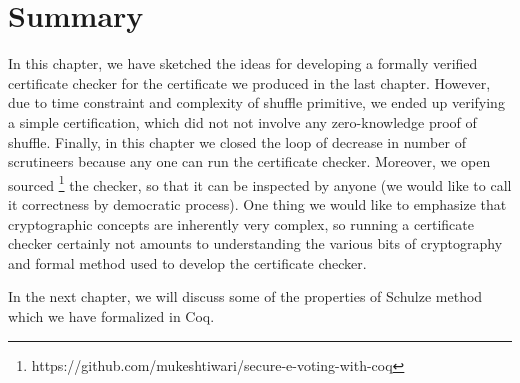 \section{Summary}
\label{sec:summary_software}
In this chapter, we have sketched the ideas for developing a formally verified certificate checker
for the certificate we produced in the last chapter. However, due to time constraint and 
complexity of shuffle primitive, 
we ended up verifying a simple certification, which did not not involve any zero-knowledge proof 
of shuffle.  Finally, in this chapter we closed the loop of decrease in number of scrutineers because 
any one can run the certificate checker. Moreover, we open sourced 
\footnote{https://github.com/mukeshtiwari/secure-e-voting-with-coq} the checker, so 
that it can be inspected by anyone (we would like to call it correctness by democratic 
process).  One thing we would like to emphasize that cryptographic concepts are 
inherently very complex, so running a certificate checker certainly not amounts 
to understanding the various bits of cryptography and formal method used to develop the
certificate checker.

In the next chapter, we will discuss some of the properties of Schulze method which we have 
formalized in Coq. 











































   
   
   
   
   
   